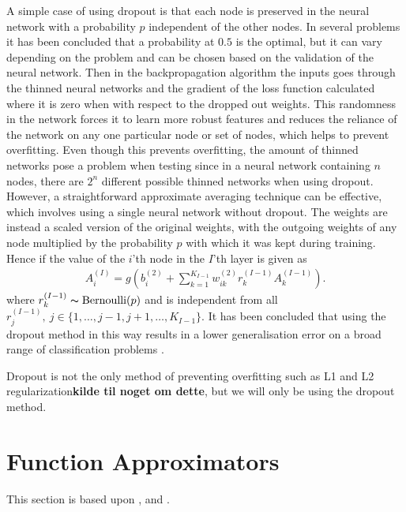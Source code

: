 A simple case of using dropout is that each node is preserved in the neural network with a probability $p$ independent of the other nodes. In several problems it has been concluded that a probability at $0.5$ is the optimal, but it can vary depending on the problem and can be chosen based on the validation of the neural network. Then in the backpropagation algorithm the inputs goes through the thinned neural networks and the gradient of the loss function calculated where it is zero when with respect to the dropped out weights. This randomness in the network forces it to learn more robust features and reduces the reliance of the network on any one particular node or set of nodes, which helps to prevent overfitting. Even though this prevents overfitting, the amount of thinned networks pose a problem when testing since in a neural network containing $n$ nodes, there are $2^n$ different possible thinned networks when using dropout. However, a straightforward approximate averaging technique can be effective, which involves using a single neural network without dropout. The weights are instead a scaled version of the original weights, with the outgoing weights of any node multiplied by the probability $p$ with which it was kept during training. Hence if the value of the $i$'th node in the $I$'th layer is given as
\begin{align*}
    A^{(I)}_i = g\left(b_{i}^{(2)} + \sum_{k=1}^{K_{I-1}} w_{ik}^{(2)}r_{k}^{(I-1)}A_{k}^{(I-1)}\right).
\end{align*}
where $r_{k}^{(I-1)} \thicksim \operatorname{Bernoulli}(p)$ and is independent from all $r_{j}^{(I-1)}, \ j\in \{1,\ldots, j-1,j+1, \ldots, K_{I-1}\}$. It has been concluded that using the dropout method in this way results in a lower generalisation error on a broad range of classification problems \citep{Dropout}.

Dropout is not the only method of preventing overfitting such as L1 and L2 regularization\textbf{kilde til noget om dette}, but we will only be using the dropout method.


\section{Function Approximators}\label{sec:UAT}
This section is based upon \citep[p. 16-17]{Art}, \citep{Barron} and \citep{REOS}.

